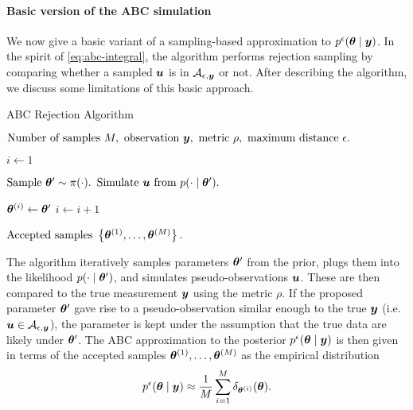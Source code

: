 \paragraph{Basic version of the ABC simulation}
We now give a basic variant of a sampling-based approximation to $p^\epsilon(\bm{\theta} \mid \bm{y})$. In the spirit of \eqref{eq:abc-integral}, the algorithm performs rejection sampling by comparing whether a sampled $\bm{u}$ is in $\mathcal{A}_{\epsilon, \bm{y}}$ or not. After describing the algorithm, we discuss some limitations of this basic approach.
\begin{algorithm}[ht]
    \caption{ABC Rejection Algorithm}
    \label{alg:abc-rejection}
    \begin{algorithmic}[1]
        \Input $\text{Number of samples } M, \text{ observation } \bm{y}, \text{ metric } \rho, \text{ maximum distance } \epsilon.$
        
        \State $i \gets 1$
        
        \State $\text{Sample } \bm{\theta}^\prime \sim \pi(\cdot).$ 
        \State $\text{Simulate } \bm{u} \text{ from } p(\cdot \mid \bm{\theta}^\prime).$ 
        
        \If {$\rho(\bu, \by) \leq \epsilon$}
        \State $\bm{\theta}^{(i)} \gets \bm{\theta}^\prime$ 
        \State $i \gets i + 1$
        \EndIf
        \EndWhile
        
        \Output $\text{Accepted samples } \left\{ \bm{\theta}^{(1)}, \ldots, \bm{\theta}^{(M)} \right\}.$
    \end{algorithmic}
\end{algorithm}

The algorithm iteratively samples parameters $\bm{\theta}^\prime$ from the prior, plugs them into the likelihood $p(\cdot \mid \bm{\theta}^\prime)$, and simulates pseudo-observations $\bm{u}$. These are then compared to the true measurement $\bm{y}$ using the metric $\rho$. If the proposed parameter $\bm{\theta}^\prime$ gave rise to a pseudo-observation similar enough to the true $\bm{y}$ (i.e. $\bm{u} \in \mathcal{A}_{\epsilon, \bm{y}}$), the parameter is kept under the assumption that the true data are likely under $\bm{\theta}^\prime$. The ABC approximation to the posterior $p^\epsilon(\bm{\theta} \mid \bm{y})$ is then given in terms of the accepted samples $\bm{\theta}^{(1)}, \ldots, \bm{\theta}^{(M)}$ as the empirical distribution
\begin{equation*}
p^\epsilon(\bm{\theta} \mid \bm{y}) \approx \frac{1}{M} \sum_{i=1}^M \delta_{\bm{\theta}^{(i)}}(\bm{\theta}).
\end{equation*}

